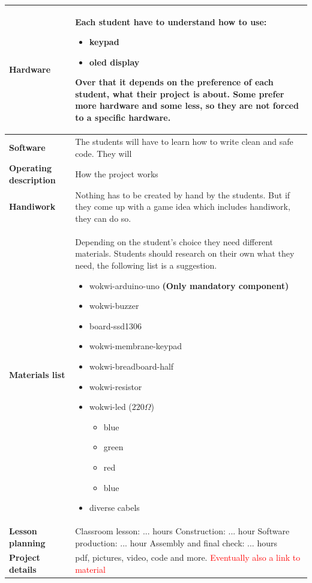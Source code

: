 \documentclass[10pt]{article}
\begin{document}
\begin{longtable}{|p{3.5cm}|p{11cm}|}
  \textbf{Hardware} & Each student have to understand how to use:
  \begin{itemize}
    \item keypad
    \item oled display
  \end{itemize} 
  Over that it depends on the preference of each student, what their project is about. Some prefer more hardware and some less, so they are not forced to a specific hardware.   
  \\ \hline
  
  \textbf{Software} & The students will have to learn how to write clean and safe code. They will  \\ \hline
  
  \textbf{Operating description} & How the project works \\ \hline
  
  \textbf{Handiwork} & Nothing has to be created by hand by the students. But if they come up with a game idea which includes handiwork, they can do so. \\ \hline
  
  \textbf{Materials list} & 
  Depending on the student's choice they need different materials. Students should research on their own what they need, the following list is a suggestion.
  \begin{itemize}
    \item wokwi-arduino-uno \textbf{(Only mandatory component)}
    \item wokwi-buzzer
    \item board-ssd1306
    \item wokwi-membrane-keypad
    \item wokwi-breadboard-half
    \item wokwi-resistor
    \item wokwi-led ($220 \Omega$)
    \begin{itemize}
      \item blue
      \item green
      \item red
      \item blue
    \end{itemize}
    \item diverse cabels
  \end{itemize}
  \\ \hline
  
  \textbf{Lesson planning} & 
  Classroom lesson: ... hours \newline
  Construction: ... hour \newline
  Software production: ... hour \newline
  Assembly and final check: ... hours \\ 
  \hline
  \textbf{Project details} & pdf, pictures, video, code and more. \newline
  \textcolor{red}{Eventually also a link to material} \\ \hline

\end{longtable}
\end{document}
